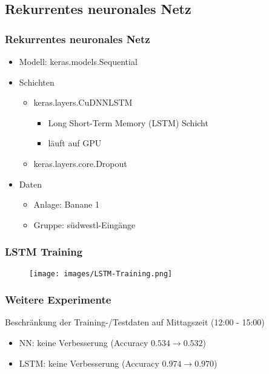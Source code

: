 \documentclass[utf8x, xcolor=dvipsnames]{beamer}
\begin{document}
\subsection{Rekurrentes neuronales Netz}
\begin{frame}
\frametitle{Rekurrentes neuronales Netz}
\begin{itemize}
	\item Modell: keras.models.Sequential\newline
	
	\item Schichten
	\begin{itemize}
		\item keras.layers.CuDNNLSTM
		\begin{itemize}
			\item Long Short-Term Memory (LSTM) Schicht
			\item läuft auf GPU
		\end{itemize}
		\item keras.layers.core.Dropout\newline
	\end{itemize}
	
	\item Daten
	\begin{itemize}
		\item Anlage: Banane 1
		\item Gruppe: südwestl-Eingänge
	\end{itemize}
\end{itemize}
\end{frame}

\begin{frame}
\frametitle{LSTM Training}
\begin{figure}
	\texttt{[image: images/LSTM-Training.png]}
\end{figure}
\end{frame}

\begin{frame}
\frametitle{Weitere Experimente}
Beschränkung der Training-/Testdaten auf Mittagszeit (12:00 - 15:00)\newline
\begin{itemize}
	\item NN: keine Verbesserung (Accuracy $0.534 \rightarrow 0.532$)
	\item LSTM: keine Verbesserung (Accuracy $0.974 \rightarrow 0.970$)
\end{itemize}
\end{frame}
\end{document}
